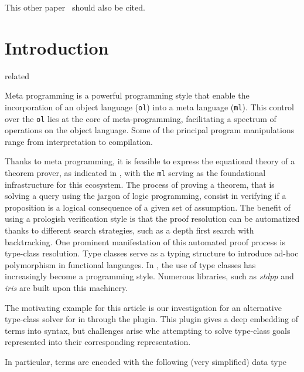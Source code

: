 \documentclass[sigconf,natbib=false]{acmart}
\def\elpi{\proglang{elpi}}
\def\coqelpi{\proglang{coq-elpi}}
\def\coq{\proglang{coq}}
\newcommand{\library}[1]{\textit{#1}\xspace}
\def\stdpp{\library{stdpp}}
\def\iris{\library{iris}}
\newcommand*{\acronym}[1]{\texttt{#1}\xspace}
\def\ol{\acronym{ol}} %
\def\ml{\acronym{ml}} %
\begin{document}
This other paper~\cite{10.1007/978-3-031-38499-8_25} should also be cited.


\section{Introduction}

related~\cite{felty93lics}

Meta programming is a powerful programming style that enable the incorporation
of an object language (\ol) into a meta language (\ml). This control over the
\ol lies at the core of meta-programming, facilitating a spectrum of operations
on the object language. Some of the principal program manipulations range
from interpretation to compilation.

Thanks to meta programming, it is feasible to express the equational theory of a
theorem prover, as indicated in \cite{X, Y, Z}, with the \ml serving as the
foundational infrastructure for this ecosystem. The process of proving a theorem, that is
solving a query using the jargon of logic programming, consist in verifying if a
proposition is a logical consequence of a given set of assumption. The benefit
of using a prologish verification style is that the proof resolution can be
automatized thanks to different search strategies, such as a depth first search
with backtracking. One prominent manifestation of this automated proof process is
type-class resolution\cite{wadler89, sozeau08}. Type classes serve as a typing
structure to introduce ad-hoc polymorphism in functional languages.
In \coq, the use of type classes has increasingly become a programming
style. Numerous libraries, such as \stdpp and
\iris are built upon this machinery.

The motivating example for this article is our investigation for an alternative
type-class solver for \coq in \elpi{} through the \coqelpi
plugin. This plugin gives a deep embedding of \coq terms into \elpi syntax, but
challenges arise whe attempting to solve type-class goals represented into their
corresponding \elpi representation.

In particular, \coq terms are encoded with the following (very simplified)
data type 

\end{document}
